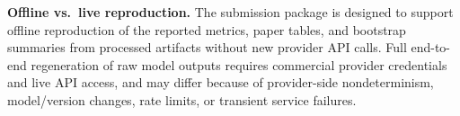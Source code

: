 \medskip\noindent\textbf{Offline vs.\ live reproduction.}
The submission package is designed to support offline reproduction of the reported
metrics, paper tables, and bootstrap summaries from processed artifacts without
new provider API calls. Full end-to-end regeneration of raw model outputs requires
commercial provider credentials and live API access, and may differ because of
provider-side nondeterminism, model/version changes, rate limits, or transient
service failures.
